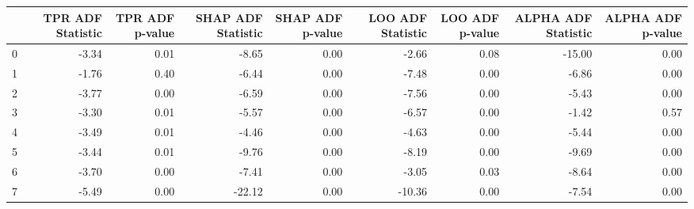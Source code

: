 \begin{tabular}{lrrrrrrrr}
\toprule
 & TPR ADF Statistic & TPR ADF p-value & SHAP ADF Statistic & SHAP ADF p-value & LOO ADF Statistic & LOO ADF p-value & ALPHA ADF Statistic & ALPHA ADF p-value \\
\midrule
0 & -3.34 & 0.01 & -8.65 & 0.00 & -2.66 & 0.08 & -15.00 & 0.00 \\
1 & -1.76 & 0.40 & -6.44 & 0.00 & -7.48 & 0.00 & -6.86 & 0.00 \\
2 & -3.77 & 0.00 & -6.59 & 0.00 & -7.56 & 0.00 & -5.43 & 0.00 \\
3 & -3.30 & 0.01 & -5.57 & 0.00 & -6.57 & 0.00 & -1.42 & 0.57 \\
4 & -3.49 & 0.01 & -4.46 & 0.00 & -4.63 & 0.00 & -5.44 & 0.00 \\
5 & -3.44 & 0.01 & -9.76 & 0.00 & -8.19 & 0.00 & -9.69 & 0.00 \\
6 & -3.70 & 0.00 & -7.41 & 0.00 & -3.05 & 0.03 & -8.64 & 0.00 \\
7 & -5.49 & 0.00 & -22.12 & 0.00 & -10.36 & 0.00 & -7.54 & 0.00 \\
\bottomrule
\end{tabular}
